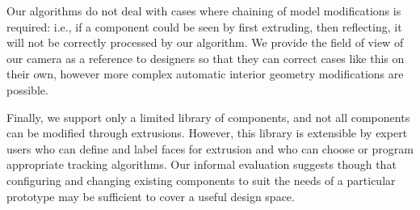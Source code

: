Our algorithms do not deal with cases where chaining of model modifications is required: i.e., if a component could be seen by first extruding, then reflecting, it will not be correctly processed by our algorithm.  We provide the field of view of our camera as a reference to designers so that they can correct cases like this on their own, however more complex automatic interior geometry modifications are possible. 

Finally, we support only a limited library of components, and not all components can be modified through extrusions.  However, this library is extensible by expert users who can define and label faces for extrusion and who can choose or program appropriate tracking algorithms. Our informal evaluation suggests though that configuring and changing existing components to suit the needs of a particular prototype may be sufficient to cover a useful design space.
